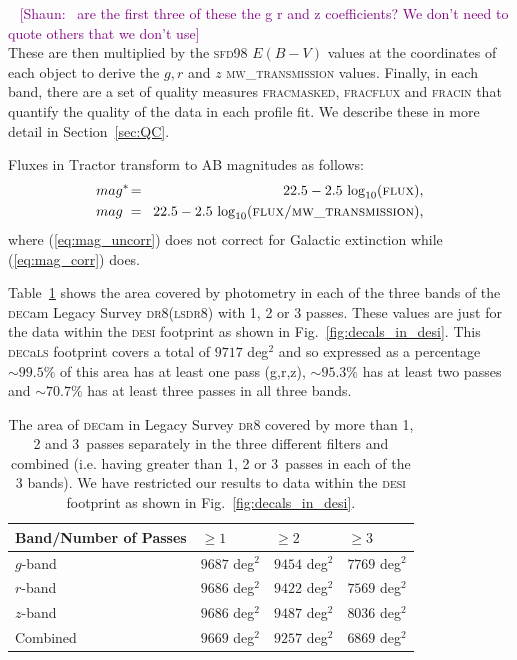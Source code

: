 \documentclass[fleqn,usenatbib]{mnras}
\newcommand{\shaun}[1]{~\newline\noindent \textcolor{Purple}{{ [Shaun:~{#1}]\\}}}
\newcommand{\CORRFLUX}{{\textsc{flux/mw\_transmission}}\xspace}
\newcommand{\DECam}{\textsc{dec}am\xspace}
\newcommand{\DECaLS}{\textsc{dec}a\textsc{ls}\xspace}
\newcommand{\DESI}{\textsc{desi}\xspace}
\newcommand{\DReight}{\textsc{dr8}\xspace}
\newcommand{\FLUX}{{\textsc{flux}}\xspace}
\newcommand{\FRACMASKED}{{\textsc{fracmasked}}\xspace}
\newcommand{\FRACFLUX}{{\textsc{fracflux}}\xspace}
\newcommand{\FRACIN}{{\textsc{fracin}}\xspace}
\newcommand{\LS}{\textsc{ls}\xspace}
\newcommand{\MWTRANSMISSION}{{\textsc{mw\_transmission}}\xspace}
\newcommand{\TRACTOR}{\textsc{T}ractor\xspace}
\begin{document}
\shaun{ are the first three of these the g r and z coefficients? We don't need to quote others that we don't use}
These are then multiplied by the \textsc{sfd98} $E(B-V)$ values at the coordinates of each object to derive the $g, r$ and $z$ \MWTRANSMISSION values. Finally, in each band, there are a set of quality measures
\FRACMASKED, \FRACFLUX and \FRACIN that quantify the quality of the data in each profile fit. We describe these in more detail in Section~\ref{sec:QC}.

Fluxes in \TRACTOR transform to AB magnitudes as follows:
\begin{eqnarray}  
    mag^{*} \negthinspace &=& \negthinspace 22.5-2.5 \,\log_{10}(\FLUX) , \label{eq:mag_uncorr} \\
    mag^{\hphantom{*}}\negthinspace &=& \negthinspace 22.5 -2.5 \, \log_{10}(\CORRFLUX) , \label{eq:mag_corr}
\end{eqnarray}
where (\ref{eq:mag_uncorr}) does not correct for Galactic extinction while (\ref{eq:mag_corr}) does.



Table~\ref{tab:band_passes} shows the area covered by photometry in each of the three bands of the \DECam Legacy Survey \DReight (\LS \DReight) with 1, 2 or 3 passes.
These values are just for the data within the \DESI footprint as shown in Fig.~\ref{fig:decals_in_desi}. This \DECaLS footprint covers a total of $9717$ deg$^2$ and so expressed as a percentage 
$\sim 99.5 \%$ of this area has at least one pass 
(g,r,z), $\sim 95.3 \%$ has at least two passes and $\sim 70.7 \%$ has at least three passes in all three bands.

\begin{table}
\caption{The area of \DECam in Legacy Survey \DReight  covered by more than 1, 2 and 3~passes
separately in the three different filters and combined (i.e. having greater than   
1, 2 or  3~passes in each of the 3 bands).
We have restricted our results to data within the \DESI footprint as shown in  Fig.~\ref{fig:decals_in_desi}.}
\label{tab:band_passes}
\centering
\begin{tabular}{ |p{2.9cm}||p{1.2cm}|p{1.2cm}|p{1.2cm}|  }
 \hline
 {\bf Band/Number of Passes} & $\geq 1$ & $\geq 2$ & $\geq 3$\\
 \hline
 $g$-band   & $9687$ deg$^2$ & $9454$ deg$^2$ & $7769$ deg$^2$ \\
 $r$-band   & $9686$ deg$^2$ & $9422$ deg$^2$ & $7569$ deg$^2$ \\
 $z$-band   & $9686$ deg$^2$ & $9487$ deg$^2$ & $8036$ deg$^2$ \\
 Combined & $9669$ deg$^2$ & $9257$ deg$^2$ & $6869$ deg$^2$ \\
 \hline
\end{tabular}
\end{table}
\end{document}
